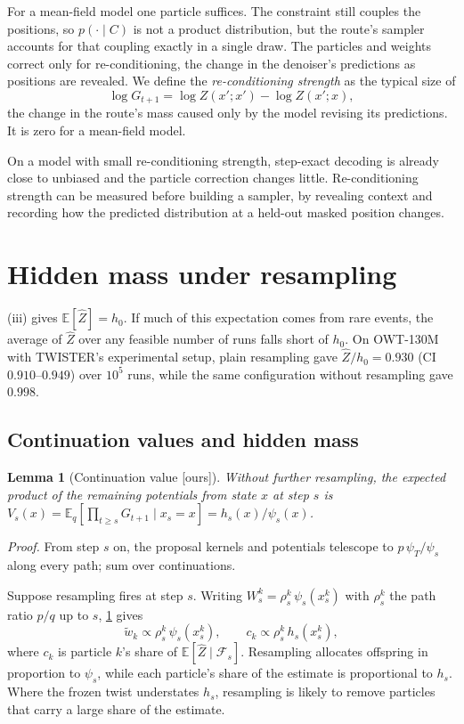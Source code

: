 \documentclass[11pt]{article}
\newtheorem{lemma}[theorem]{Lemma}
\theoremstyle{definition}
\newcommand{\E}{\mathbb{E}}
\newcommand{\Zh}{\widehat Z}
\newcommand{\wt}{\tilde w}
\newcommand{\status}[1]{\textsf{\small[#1]}}
\newcommand{\proofref}[1]{\par\noindent\textit{Proof.} #1\par\smallskip}
\begin{document}
For a mean-field model one particle suffices. The constraint still couples the positions, so $p(\cdot\mid C)$ is
not a product distribution, but the route's sampler accounts for that coupling exactly in a single draw. The
particles and weights correct only for re-conditioning, the change in the denoiser's predictions as positions are
revealed. We define the \emph{re-conditioning strength} as the typical size of
\[
  \log G_{t+1}=\log Z(x';x')-\log Z(x';x),
\]
the change in the route's mass caused only by the model revising its predictions. It is zero for a mean-field
model.

On a model with small re-conditioning strength, step-exact decoding is already close to unbiased and the particle
correction changes little. Re-conditioning strength can be measured before building a sampler, by revealing
context and recording how the predicted distribution at a held-out masked position changes.

\section{Hidden mass under resampling}\label{sec:practice}

(iii) gives $\E[\Zh]=h_0$. If much of this expectation comes from rare events, the average of $\Zh$
over any feasible number of runs falls short of $h_0$. On OWT-130M with TWISTER's experimental setup, plain
resampling gave $\Zh/h_0=0.930$ (CI $0.910$--$0.949$) over $10^5$ runs, while the same configuration without
resampling gave $0.998$.

\subsection{Continuation values and hidden mass}
\begin{lemma}[Continuation value \status{ours}]\label{lem:cont}
Without further resampling, the expected product of the remaining potentials from state $x$ at step $s$ is
$V_s(x)=\E_q[\prod_{t\ge s}G_{t+1}\mid x_s=x]=h_s(x)/\psi_s(x)$.
\end{lemma}
\proofref{From step $s$ on, the proposal kernels and potentials telescope to $p\,\psi_T/\psi_s$ along every path;
sum over continuations.}

Suppose resampling fires at step $s$. Writing $W^k_s=\rho^k_s\,\psi_s(x^k_s)$ with $\rho^k_s$ the path ratio
$p/q$ up to $s$, \cref{lem:cont} gives
\begin{equation}\label{eq:mismatch}
  \wt_k\propto\rho^k_s\,\psi_s(x^k_s),\qquad
  c_k\propto\rho^k_s\,h_s(x^k_s),
\end{equation}
where $c_k$ is particle $k$'s share of $\E[\Zh\mid\mathcal F_s]$. Resampling allocates offspring in proportion to
$\psi_s$, while each particle's share of the estimate is proportional to $h_s$. Where the frozen twist understates
$h_s$, resampling is likely to remove particles that carry a large share of the estimate.
\end{document}
